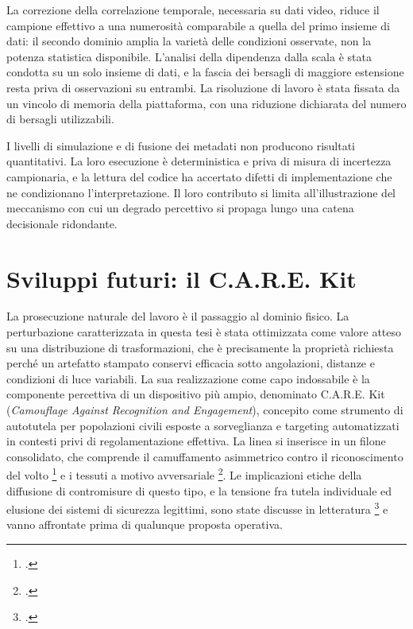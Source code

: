 \documentclass[a4paper,12pt]{report}
\begin{document}
La correzione della correlazione temporale, necessaria su dati video, riduce il campione effettivo a una numerosità comparabile a quella del primo insieme di dati: il secondo dominio amplia la varietà delle condizioni osservate, non la potenza statistica disponibile. L'analisi della dipendenza dalla scala è stata condotta su un solo insieme di dati, e la fascia dei bersagli di maggiore estensione resta priva di osservazioni su entrambi. La risoluzione di lavoro è stata fissata da un vincolo di memoria della piattaforma, con una riduzione dichiarata del numero di bersagli utilizzabili.

I livelli di simulazione e di fusione dei metadati non producono risultati quantitativi. La loro esecuzione è deterministica e priva di misura di incertezza campionaria, e la lettura del codice ha accertato difetti di implementazione che ne condizionano l'interpretazione. Il loro contributo si limita all'illustrazione del meccanismo con cui un degrado percettivo si propaga lungo una catena decisionale ridondante.

\section{Sviluppi futuri: il C.A.R.E. Kit}

La prosecuzione naturale del lavoro è il passaggio al dominio fisico. La perturbazione caratterizzata in questa tesi è stata ottimizzata come valore atteso su una distribuzione di trasformazioni, che è precisamente la proprietà richiesta perché un artefatto stampato conservi efficacia sotto angolazioni, distanze e condizioni di luce variabili. La sua realizzazione come capo indossabile è la componente percettiva di un dispositivo più ampio, denominato C.A.R.E. Kit (\textit{Camouflage Against Recognition and Engagement}), concepito come strumento di autotutela per popolazioni civili esposte a sorveglianza e targeting automatizzati in contesti privi di regolamentazione effettiva. La linea si inserisce in un filone consolidato, che comprende il camuffamento asimmetrico contro il riconoscimento del volto \footcite{harvey_2010} e i tessuti a motivo avversariale \footcite{wu_2020, hu_2022}. Le implicazioni etiche della diffusione di contromisure di questo tipo, e la tensione fra tutela individuale ed elusione dei sistemi di sicurezza legittimi, sono state discusse in letteratura \footcite{helkala_2023} e vanno affrontate prima di qualunque proposta operativa.
\end{document}
